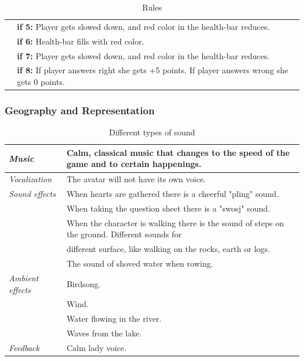 \begin{table} [H]
\begin{tabular}{|p{}|p{}|}
             	   & \textbf{if 5:} Player gets slowed down, and red color in the health-bar reduces.   \\ \cline{2-2}
	               & \textbf{if 6:} Health-bar fills with red color.  \\ \cline{2-2}
	               & \textbf{if 7:} Player gets slowed down, and red color in the health-bar reduces.  \\ \cline{2-2}
	               & \textbf{if 8:} If player answers right she gets +5 points. If player answers wrong she gets 0 points.  \\ \hline
    \end{tabular}
    \caption[Rules in the "Nature Trail" game]{Rules}
    \label{tab:rules1}
\end{table}  

\subsubsection{Geography and Representation}

\begin{table} [H]
\centering
    \begin{tabular}{|p{}|p{}|}
       \hline
       \emph{Music} & Calm, classical music that changes to the speed of the game and to certain happenings. \\ \hline
       \emph{Vocalization} & The avatar will not have its own voice. \\ \hline
       \emph{Sound effects} &  When hearts are gathered there is a cheerful "pling" sound.  \\ \cline{2-2}
	    &  When taking the question sheet there is a "swosj" sound.\\ \cline{2-2}
	     & When the character is walking there is the sound of steps on the ground. Different sounds for \\ & different surface, like walking on the rocks, earth or logs.\\ \cline{2-2}
	       & The sound of shoved water when rowing. \\ \hline
	       \emph{Ambient effects} & Birdsong. \\ \cline{2-2}
	         & Wind. \\ \cline{2-2}
	         & Water flowing in the river. \\ \cline{2-2}
	         & Waves from the lake.\\ \hline
	         \emph{Feedback} & Calm lady voice. \\ \hline
    \end{tabular}
    \caption[Different types of sound]{Different types of sound}
    \label{tab:sound1}
\end{table}  

